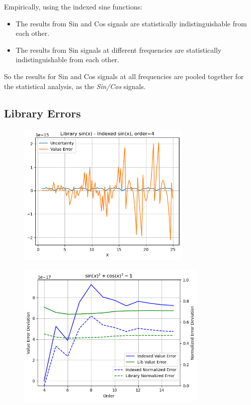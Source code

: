\documentclass[twoside]{article}
\numberwithin{equation}{section}
\begin{document}
Empirically, using the indexed sine functions:
\begin{itemize}
\item The results from Sin and Cos signals are statistically indistinguishable from each other.

\item The results from Sin signals at different frequencies are statistically indistinguishable from each other.
\end{itemize}
So the results for Sin and Cos signals at all frequencies are pooled together for the statistical analysis, as the \emph{Sin/Cos} signals.


\subsection{Library Errors}

\begin{figure}[p]
\includegraphics[height=2.75in]{Sin_Diff.png} 
\label{fig: Sin_Diff}
\end{figure}

\begin{figure}[p]
\includegraphics[height=2.75in]{Sin_Error.png} 
\label{fig: Sin_Error}
\end{figure}
\end{document}
